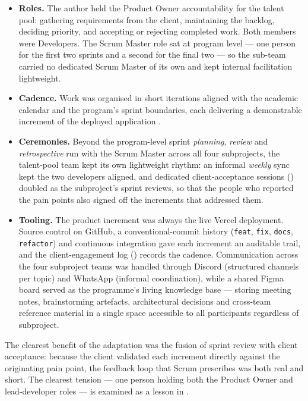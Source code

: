 \begin{itemize}
	\item \textbf{Roles.} The author held the Product Owner
	accountability for the talent pool: gathering requirements from the
	client, maintaining the backlog, deciding priority, and accepting or
	rejecting completed work. Both members were Developers. The Scrum Master
	role sat at program level --- one person for the first two sprints and a
	second for the final two --- so the sub-team carried no dedicated Scrum
	Master of its own and kept internal facilitation lightweight.
	\item \textbf{Cadence.} Work was organised in short iterations aligned
	with the academic calendar and the program's sprint boundaries, each
	delivering a demonstrable increment of the deployed application
	\parencite{BeckAgileManifesto2001}.
	\item \textbf{Ceremonies.} Beyond the program-level sprint
	\emph{planning}, \emph{review} and \emph{retrospective} run with the
	Scrum Master across all four subprojects, the talent-pool team kept its
		own lightweight rhythm: an informal \emph{weekly} sync kept the two
	developers aligned, and dedicated client-acceptance sessions
	() doubled as the subproject's sprint
	reviews, so that the people who reported the pain points also signed off
	the increments that addressed them.
	\item \textbf{Tooling.} The product increment was always the live
	Vercel deployment. Source control on GitHub, a conventional-commit
	history (\texttt{feat}, \texttt{fix}, \texttt{docs}, \texttt{refactor})
	and continuous integration gave each increment an auditable trail, and
	the client-engagement log () records the cadence.
	Communication across the four subproject teams was handled through
	Discord (structured channels per topic) and WhatsApp (informal
	coordination), while a shared Figma board served as the programme's
	living knowledge base --- storing meeting notes, brainstorming
	artefacts, architectural decisions and cross-team reference material
	in a single space accessible to all participants regardless of
	subproject.
\end{itemize}

The clearest benefit of the adaptation was the fusion of sprint review with
client acceptance: because the client validated each increment directly
against the originating pain point, the feedback loop that Scrum prescribes
was both real and short. The clearest tension --- one person holding both
the Product Owner and lead-developer roles --- is examined as a lesson in
.

